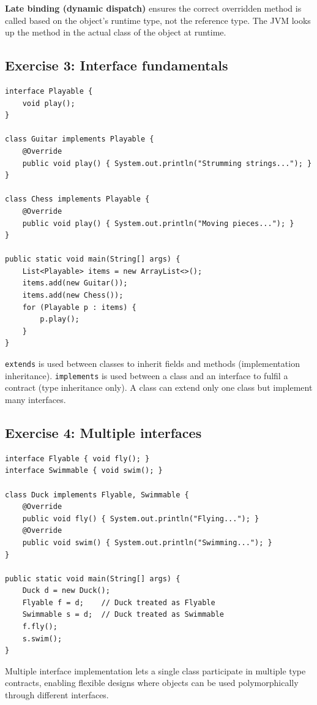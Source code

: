 \documentclass[twoside=false,DIV=14]{scrartcl}
\begin{document}
\textbf{Late binding (dynamic dispatch)} ensures the correct overridden method is called based on the object's runtime type, not the reference type. The JVM looks up the method in the actual class of the object at runtime.

\subsection*{Exercise 3: Interface fundamentals}

\begin{lstlisting}
interface Playable {
    void play();
}

class Guitar implements Playable {
    @Override
    public void play() { System.out.println("Strumming strings..."); }
}

class Chess implements Playable {
    @Override
    public void play() { System.out.println("Moving pieces..."); }
}

public static void main(String[] args) {
    List<Playable> items = new ArrayList<>();
    items.add(new Guitar());
    items.add(new Chess());
    for (Playable p : items) {
        p.play();
    }
}
\end{lstlisting}

\texttt{extends} is used between classes to inherit fields and methods (implementation inheritance).  \texttt{implements} is used between a class and an interface to fulfil a contract (type inheritance only).  A class can extend only one class but implement many interfaces.

\subsection*{Exercise 4: Multiple interfaces}

\begin{lstlisting}
interface Flyable { void fly(); }
interface Swimmable { void swim(); }

class Duck implements Flyable, Swimmable {
    @Override
    public void fly() { System.out.println("Flying..."); }
    @Override
    public void swim() { System.out.println("Swimming..."); }
}

public static void main(String[] args) {
    Duck d = new Duck();
    Flyable f = d;    // Duck treated as Flyable
    Swimmable s = d;  // Duck treated as Swimmable
    f.fly();
    s.swim();
}
\end{lstlisting}

Multiple interface implementation lets a single class participate in multiple type contracts, enabling flexible designs where objects can be used polymorphically through different interfaces.
\end{document}

